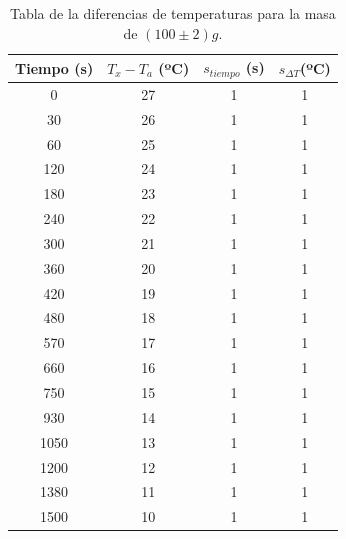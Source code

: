 \documentclass[a4paper]{article}
\begin{document}
\begin{table}[H]
  \centering
    \begin{tabular}{|c|c|c|c|} \hline
    Tiempo (s) & $T_x - T_a$ (ºC) & $s_{tiempo }$ (s) &  $s_{ \Delta T} $(ºC) \\ \hline
    0     & 27    & 1     & 1 \\ \hline
    30    & 26    & 1     & 1 \\ \hline
    60    & 25    & 1     & 1 \\ \hline
    120   & 24    & 1     & 1 \\ \hline
    180   & 23    & 1     & 1 \\ \hline
    240   & 22    & 1     & 1 \\ \hline
    300   & 21    & 1     & 1 \\ \hline
    360   & 20    & 1     & 1 \\ \hline
    420   & 19    & 1     & 1 \\ \hline
    480   & 18    & 1     & 1 \\ \hline
    570   & 17    & 1     & 1 \\ \hline
    660   & 16    & 1     & 1 \\ \hline
    750   & 15    & 1     & 1 \\ \hline
    930   & 14    & 1     & 1 \\ \hline
    1050  & 13    & 1     & 1 \\ \hline
    1200  & 12    & 1     & 1 \\ \hline
    1380  & 11    & 1     & 1 \\ \hline
    1500  & 10    & 1     & 1 \\ \hline
    \end{tabular}%
  \caption{Tabla de la diferencias de temperaturas para la masa de $(100\pm 2)g$.}
\end{table}%
\end{document}
